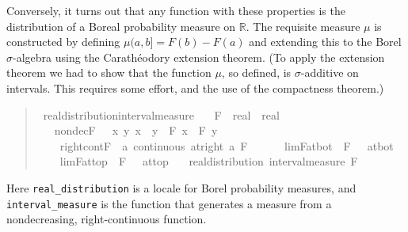 \documentclass{svjour3}
\newcommand{\RR}{\mathbb{R}}
\begin{document}
Conversely, it turns out that any function with these properties is the distribution of a Boreal probability measure on $\RR$. The requisite measure $\mu$ is constructed by defining $\mu (a,b] = F(b) - F(a)$ and extending this to the Borel $\sigma$-algebra using the Carath\'eodory extension theorem. (To apply the extension theorem we had to show that the function $\mu$, so defined, is $\sigma$-additive on intervals. This requires some effort, and the use of the compactness theorem.)
\begin{quote}
\begin{isabellebody}
\isamarkupfalse%
\ real{\isacharunderscore}distribution{\isacharunderscore}interval{\isacharunderscore}measure{\isacharcolon}\isanewline
\ \ \ F\ {\isacharcolon}{\isacharcolon}\ {\isachardoublequoteopen}real\ {\isasymRightarrow}\ real{\isachardoublequoteclose}\isanewline
\ \ \ nondecF\ {\isacharcolon}\ {\isachardoublequoteopen}{\isasymAnd}\ x\ y{\isachardot}\ x\ {\isasymle}\ y\ {\isasymLongrightarrow}\ F\ x\ {\isasymle}\ F\ y{\isachardoublequoteclose}\ \isanewline
\ \ \ \ right{\isacharunderscore}cont{\isacharunderscore}F\ {\isacharcolon}\ {\isachardoublequoteopen}{\isasymAnd}a{\isachardot}\ continuous\ {\isacharparenleft}at{\isacharunderscore}right\ a{\isacharparenright}\ F{\isachardoublequoteclose}\ \ \isanewline
\ \ \ \ lim{\isacharunderscore}F{\isacharunderscore}at{\isacharunderscore}bot\ {\isacharcolon}\ {\isachardoublequoteopen}{\isacharparenleft}F\ {\isacharminus}{\isacharminus}{\isacharminus}{\isachargreater}\ {}{\isacharparenright}\ at{\isacharunderscore}bot{\isachardoublequoteclose}\ \isanewline
\ \ \ \ lim{\isacharunderscore}F{\isacharunderscore}at{\isacharunderscore}top\ {\isacharcolon}\ {\isachardoublequoteopen}{\isacharparenleft}F\ {\isacharminus}{\isacharminus}{\isacharminus}{\isachargreater}\ {}{\isacharparenright}\ at{\isacharunderscore}top{\isachardoublequoteclose}\isanewline
\ \ \ {\isachardoublequoteopen}real{\isacharunderscore}distribution\ {\isacharparenleft}interval{\isacharunderscore}measure\ F{\isacharparenright}{\isachardoublequoteclose}
\end{isabellebody}
\end{quote}
Here \texttt{real\_distribution} is a locale for Borel probability measures, and \texttt{interval\_measure} is the function that generates a measure from a nondecreasing, right-continuous function.
\end{document}
